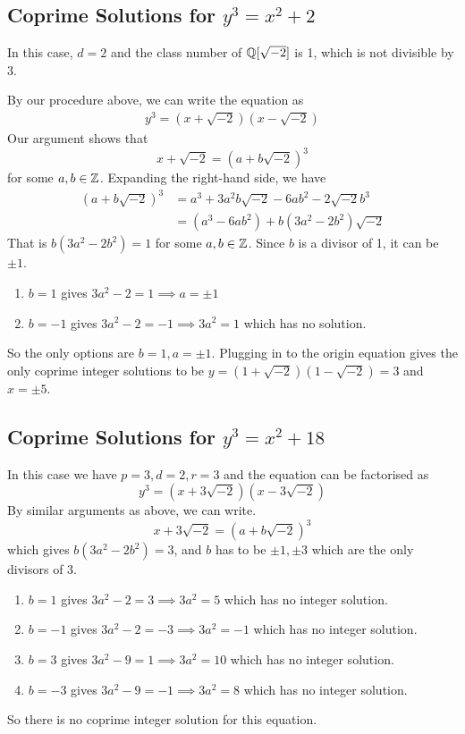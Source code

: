 \subsection{Coprime Solutions for \texorpdfstring{$y^3 = x^2 + 2$}{}}

In this case, $d = 2$ and the class number of $\mathbb{Q}[\sqrt{-2}]$ is 1, which is not divisible by 3.

By our procedure above, we can write the equation as
\begin{align*}
	y^3 = (x + \sqrt{-2})(x - \sqrt{-2})
\end{align*}
Our argument shows that
$$
	x + \sqrt{-2} = (a + b\sqrt{-2})^3
$$
for some $a, b \in \mathbb{Z}$.
Expanding the right-hand side, we have
\begin{align*}
	(a + b\sqrt{-2})^3 &= a^3 + 3a^2 b \sqrt{-2} - 6ab^2 - 2 \sqrt{-2} b^3 \\ 
					   &= (a^3 - 6ab^2) + b(3a^2 - 2b^2) \sqrt{-2}
\end{align*}
That is $b(3a^2 - 2b^2) = 1$ for some $a, b \in \mathbb{Z}$.
Since $b$ is a divisor of 1, it can be $\pm 1$.
\begin{enumerate}
	\item $b = 1$ gives $3a^2 - 2 = 1 \implies a = \pm 1$
	\item $b = -1$ gives $3a^2 - 2 = -1 \implies 3a^2 = 1$ which has no solution.
\end{enumerate}
So the only options are $b = 1, a = \pm 1$.
Plugging in to the origin equation gives the only coprime integer solutions to be $y = (1 + \sqrt{-2})(1 - \sqrt{-2}) =  3$ and $x = \pm 5$.

\subsection{Coprime Solutions for \texorpdfstring{$y^3 = x^2 + 18$}{}}\label{sol:coprime-18}

In this case we have $p = 3, d = 2, r = 3$ and the equation can be factorised as
$$
	y^3 = (x + 3\sqrt{-2})(x - 3\sqrt{-2})
$$
By similar arguments as above, we can write. 
$$
	x + 3\sqrt{-2} = (a + b\sqrt{-2})^3
$$
which gives $b(3a^2 - 2b^2) = 3$, and $b$ has to be $\pm 1, \pm 3$ which are the only divisors of 3.
\begin{enumerate}
	\item $b = 1$ gives $3a^2 - 2 = 3 \implies 3a^2 = 5$ which has no integer solution.
	\item $b = -1$ gives $3a^2 - 2 = -3 \implies 3a^2 = -1$ which has no integer solution.
	\item $b = 3$ gives $3a^2 - 9 = 1 \implies 3a^2 = 10$ which has no integer solution.
	\item $b = -3$ gives $3a^2 - 9 = -1 \implies 3a^2 = 8$ which has no integer solution.
\end{enumerate}
So there is no coprime integer solution for this equation.

